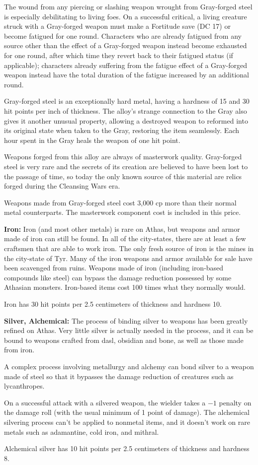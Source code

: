 The wound from any piercing or slashing weapon wrought from Gray-forged steel is especially debilitating to living foes. On a successful critical, a living creature struck with a Gray-forged weapon must make a Fortitude save (DC 17) or become fatigued for one round. Characters who are already fatigued from any source other than the effect of a Gray-forged weapon instead become exhausted for one round, after which time they revert back to their fatigued status (if applicable); characters already suffering from the fatigue effect of a Gray-forged weapon instead have the total duration of the fatigue increased by an additional round.

Gray-forged steel is an exceptionally hard metal, having a hardness of 15 and 30 hit points per inch of thickness. The alloy’s strange connection to the Gray also gives it another unusual property, allowing a destroyed weapon to reformed into its original state when taken to the Gray, restoring the item seamlessly. Each hour spent in the Gray heals the weapon of one hit point.

Weapons forged from this alloy are always of masterwork quality. Gray-forged steel is very rare and the secrets of its creation are believed to have been lost to the passage of time, so today the only known source of this material are relics forged during the Cleansing Wars era.

Weapons made from Gray-forged steel cost 3,000 cp more than their normal metal counterparts. The masterwork component cost is included in this price.

\textbf{Iron:} Iron (and most other metals) is rare on Athas, but weapons and armor made of iron can still be found. In all of the city-states, there are at least a few craftsmen that are able to work iron. The only fresh source of iron is the mines in the city-state of Tyr. Many of the iron weapons and armor available for sale have been scavenged from ruins. Weapons made of iron (including iron-based compounds like steel) can bypass the damage reduction possessed by some Athasian monsters. Iron-based items cost 100 times what they normally would.

Iron has 30 hit points per 2.5 centimeters of thickness and hardness 10.

\textbf{Silver, Alchemical:} The process of binding silver to weapons has been greatly refined on Athas. Very little silver is actually needed in the process, and it can be bound to weapons crafted from dasl, obsidian and bone, as well as those made from iron.

A complex process involving metallurgy and alchemy can bond silver to a weapon made of steel so that it bypasses the damage reduction of creatures such as lycanthropes.

On a successful attack with a silvered weapon, the wielder takes a $-1$ penalty on the damage roll (with the usual minimum of 1 point of damage). The alchemical silvering process can't be applied to nonmetal items, and it doesn't work on rare metals such as adamantine, cold iron, and mithral.

Alchemical silver has 10 hit points per 2.5 centimeters of thickness and hardness 8.
